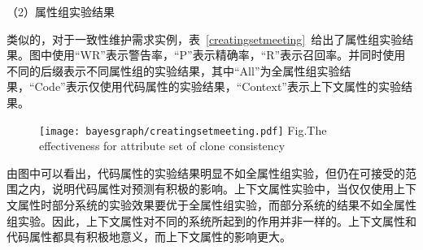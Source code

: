 （2）属性组实验结果

类似的，对于一致性维护需求实例，表~\ref{creatingsetmeeting}~给出了属性组实验结果。图中使用“WR”表示警告率，“P”表示精确率，“R”表示召回率。并同时使用不同的后缀表示不同属性组的实验结果，其中“All”为全属性组实验结果，“Code”表示仅使用代码属性的实验结果，“Context”表示上下文属性的实验结果。

\begin{figure}[h]
\centering
\texttt{[image: bayesgraph/creatingsetmeeting.pdf]}
{Fig.$\!$}{The effectiveness for attribute set of clone consistency}
\vspace{-1em}
\end{figure}



由图中可以看出，代码属性的实验结果明显不如全属性组实验，但仍在可接受的范围之内，说明代码属性对预测有积极的影响。上下文属性实验中，当仅仅使用上下文属性时部分系统的实验效果要优于全属性组实验，而部分系统的结果不如全属性组实验。因此，上下文属性对不同的系统所起到的作用并非一样的。上下文属性和代码属性都具有积极地意义，而上下文属性的影响更大。


